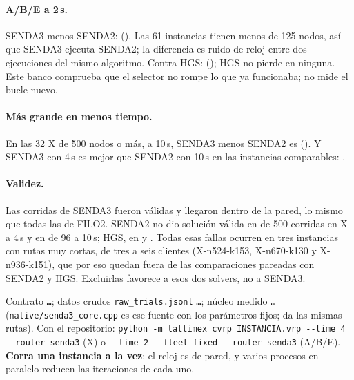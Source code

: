 \documentclass[11pt,a4paper]{article}
\newcommand{\sendados}{SENDA2}
\newcommand{\sendatres}{SENDA3}
\newcommand{\tsl}[1]{\texttt{\small #1}}
\begin{document}
\paragraph{A/B/E a 2\,s.} \sendatres{} menos \sendados: \DABETresDos{} (\DABETresDosCuenta). Las 61
instancias tienen menos de 125 nodos, así que \sendatres{} ejecuta \sendados; la diferencia es ruido de
reloj entre dos ejecuciones del mismo algoritmo. Contra HGS: \DABETresHgs{} (\DABETresHgsCuenta);
HGS no pierde en ninguna. Este banco comprueba que el selector no rompe lo que ya funcionaba; no mide
el bucle nuevo.

\paragraph{Más grande en menos tiempo.} En las 32 X de 500 nodos o más, a 10\,s, \sendatres{} menos
\sendados{} es \DXGTresDos{} (\DXGTresDosCuenta). Y \sendatres{} con 4\,s es mejor que \sendados{} con
10\,s en las \DTresIVDosXN{} instancias comparables: \DTresIVDosX.

\paragraph{Validez.} Las \TresCorridas{} corridas de \sendatres{} fueron válidas y llegaron dentro de la
pared, lo mismo que todas las de FILO2. \sendados{} no dio solución válida en \DosFallasX{} de 500
corridas en X a 4\,s y en \DosFallasXG{} de 96 a 10\,s; HGS, en \HgsFallasX{} y \HgsFallasXG. Todas esas
fallas ocurren en tres instancias con rutas muy cortas, de tres a seis clientes (X-n524-k153, X-n670-k130 y
X-n936-k151), que por eso quedan fuera de las comparaciones pareadas con \sendados{} y HGS. Excluirlas
favorece a esos dos solvers, no a \sendatres.

\begin{reproducir}
Contrato \tsl{\HashContrato\ldots}; datos crudos \tsl{raw\_trials.jsonl} \tsl{\HashRaw\ldots}; núcleo
medido \tsl{\HashNucleo\ldots} (\tsl{native/senda3\_core.cpp} es ese fuente con los parámetros
fijos; da las mismas rutas). Con el repositorio:
\tsl{python -m lattimex cvrp INSTANCIA.vrp -{}-time 4 -{}-router senda3} (X) o
\tsl{-{}-time 2 -{}-fleet fixed -{}-router senda3} (A/B/E). \textbf{Corra una instancia a la vez}: el reloj
es de pared, y varios procesos en paralelo reducen las iteraciones de cada uno.
\end{reproducir}

\end{document}
